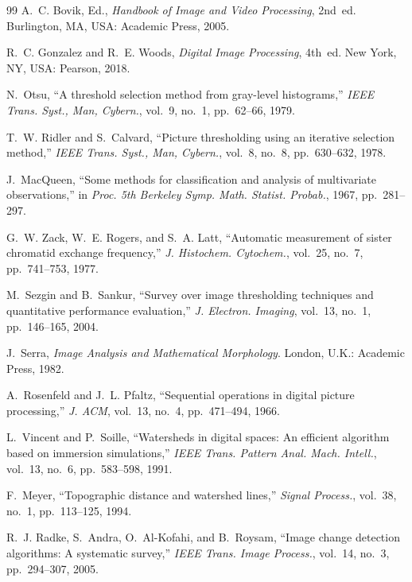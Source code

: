 \documentclass[conference,a4paper]{IEEEtran}
\begin{document}
\begin{thebibliography}{99}
A.~C. Bovik, Ed., \emph{Handbook of Image and Video Processing}, 2nd~ed. Burlington, MA, USA: Academic Press, 2005.

R.~C. Gonzalez and R.~E. Woods, \emph{Digital Image Processing}, 4th~ed. New York, NY, USA: Pearson, 2018.

N.~Otsu, ``A threshold selection method from gray-level histograms,'' \emph{IEEE Trans. Syst., Man, Cybern.}, vol.~9, no.~1, pp.~62--66, 1979.

T.~W. Ridler and S.~Calvard, ``Picture thresholding using an iterative selection method,'' \emph{IEEE Trans. Syst., Man, Cybern.}, vol.~8, no.~8, pp.~630--632, 1978.

J.~MacQueen, ``Some methods for classification and analysis of multivariate observations,'' in \emph{Proc. 5th Berkeley Symp. Math. Statist. Probab.}, 1967, pp.~281--297.

G.~W. Zack, W.~E. Rogers, and S.~A. Latt, ``Automatic measurement of sister chromatid exchange frequency,'' \emph{J. Histochem. Cytochem.}, vol.~25, no.~7, pp.~741--753, 1977.

M.~Sezgin and B.~Sankur, ``Survey over image thresholding techniques and quantitative performance evaluation,'' \emph{J. Electron. Imaging}, vol.~13, no.~1, pp.~146--165, 2004.

J.~Serra, \emph{Image Analysis and Mathematical Morphology}. London, U.K.: Academic Press, 1982.

A.~Rosenfeld and J.~L. Pfaltz, ``Sequential operations in digital picture processing,'' \emph{J. ACM}, vol.~13, no.~4, pp.~471--494, 1966.

L.~Vincent and P.~Soille, ``Watersheds in digital spaces: An efficient algorithm based on immersion simulations,'' \emph{IEEE Trans. Pattern Anal. Mach. Intell.}, vol.~13, no.~6, pp.~583--598, 1991.

F.~Meyer, ``Topographic distance and watershed lines,'' \emph{Signal Process.}, vol.~38, no.~1, pp.~113--125, 1994.

R.~J. Radke, S.~Andra, O.~Al-Kofahi, and B.~Roysam, ``Image change detection algorithms: A systematic survey,'' \emph{IEEE Trans. Image Process.}, vol.~14, no.~3, pp.~294--307, 2005.


\end{thebibliography}
\end{document}
